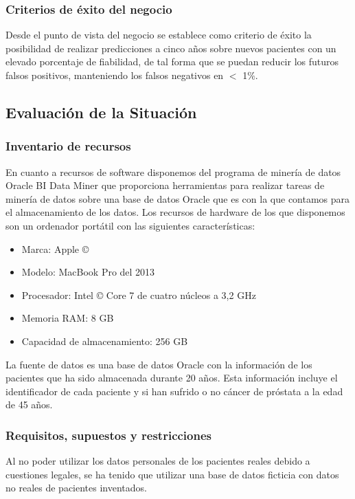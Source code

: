 \documentclass{article}
\begin{document}
\subsubsection{Criterios de éxito del negocio}
Desde el punto de vista del negocio se establece como criterio de éxito la posibilidad de realizar predicciones a cinco años sobre nuevos pacientes con un elevado porcentaje de fiabilidad, de tal forma que se puedan reducir los futuros falsos positivos, manteniendo los falsos negativos en $<$ 1\%.

\subsection{Evaluación de la Situación}

\subsubsection{Inventario de recursos}
En cuanto a recursos de software disponemos del programa de minería de datos Oracle BI Data Miner que proporciona herramientas para realizar tareas de minería de datos sobre una base de datos Oracle que es con la que contamos para el almacenamiento de los datos. Los recursos de hardware de los que disponemos son un ordenador portátil con las siguientes características:

\begin{itemize}
	\item Marca: Apple ©
	\item Modelo: MacBook Pro del 2013
	\item Procesador: Intel © Core 7 de cuatro núcleos a 3,2 GHz
	\item Memoria RAM: 8 GB
	\item Capacidad de almacenamiento: 256 GB
\end{itemize}

La fuente de datos es una base de datos Oracle con la información de los pacientes que ha sido almacenada durante 20 años. Esta información incluye el identificador de cada paciente y si han sufrido o no cáncer de próstata a la edad de 45 años.

\subsubsection{Requisitos, supuestos y restricciones}
Al no poder utilizar los datos personales de los pacientes reales debido a cuestiones legales, se ha tenido que utilizar una base de datos ficticia con datos no reales de pacientes inventados.
\end{document}
